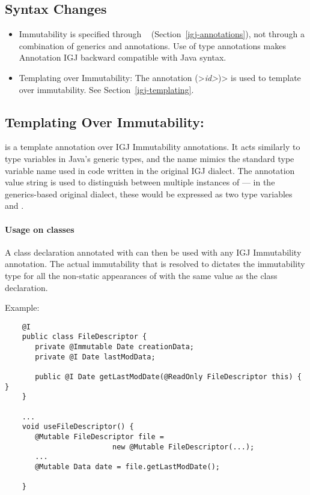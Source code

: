 \subsection{Syntax Changes}

\begin{itemize}

\item  Immutability is specified through
  ~\cite{JSR308-2008-09-12} (Section~\ref{igj-annotations}),
not through a combination of generics and annotations.  Use of type
annotations makes Annotation IGJ backward compatible with Java syntax.

\item Templating over Immutability: The annotation \<(>\emph{\<id>}\<)> is used to template
over immutability.  See Section~\ref{igj-templating}.

\end{itemize}


\subsection{Templating Over Immutability: \label{igj-templating}}

 is a template annotation over IGJ Immutability annotations. It acts
similarly to type variables in Java's generic types, and the name
 mimics the standard  type variable name used in code
written in the original IGJ dialect.  The annotation value string is used
to distinguish between multiple instances of  --- in the
generics-based original dialect, these would be expressed as two type
variables  and .

\paragraph{Usage on classes\label{igj-usage-on-classes}}

A class declaration annotated with  can then be
used with any IGJ Immutability annotation.  The actual immutability that
 is resolved to dictates the immutability type for all the non-static
appearances of  with the same value as the class declaration.

  Example:
\begin{Verbatim}
    @I
    public class FileDescriptor {
       private @Immutable Date creationData;
       private @I Date lastModData;

       public @I Date getLastModDate(@ReadOnly FileDescriptor this) { }
    }

    ...
    void useFileDescriptor() {
       @Mutable FileDescriptor file =
                         new @Mutable FileDescriptor(...);
       ...
       @Mutable Data date = file.getLastModDate();

    }
\end{Verbatim}

